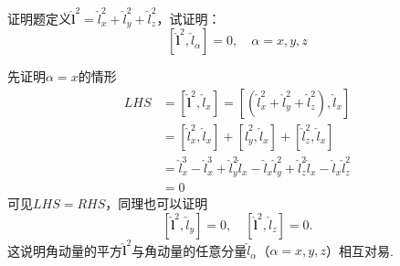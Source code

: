 \begin{question}{证明题}定义$\hat{\boldsymbol{l}}^2 = \hat{l}_x^2 + \hat{l}_y^2 + \hat{l}_z^2$，试证明：
    $$
        \left[\hat{\boldsymbol{l}}^2, \hat{l}_{\alpha}\right] = 0,
        \quad \alpha=x,y,z
    $$
\end{question}
\begin{solution}
    先证明$\alpha=x$的情形
    $$
        \begin{aligned}
            LHS
             & = \left[\hat{\boldsymbol{l}}^2, \hat{l}_x\right] = \left[\left(\hat{l}_x^2+\hat{l}_y^2+\hat{l}_z^2\right), \hat{l}_x\right] \\
             & = \left[\hat{l}_x^2, \hat{l}_x\right] + \left[\hat{l}_y^2, \hat{l}_x\right] + \left[\hat{l}_z^2, \hat{l}_x\right]           \\
             & = \hat{l}_x^3-\hat{l}_x^3+\hat{l}_y^2\hat{l}_x-\hat{l}_x\hat{l}_y^2+\hat{l}_z^2\hat{l}_x-\hat{l}_x\hat{l}_z^2               \\
             & = 0
        \end{aligned}
    $$
    可见$LHS=RHS$，同理也可以证明
    $$
        \left[\hat{\boldsymbol{l}}^2, \hat{l}_y\right] = 0,
        \quad
        \left[\hat{\boldsymbol{l}}^2, \hat{l}_z\right] = 0.
    $$
    这说明角动量的平方$\hat{\boldsymbol{l}}^2$与角动量的任意分量$\hat{l}_{\alpha}$（$\alpha=x, y, z$）相互对易.
\end{solution}




